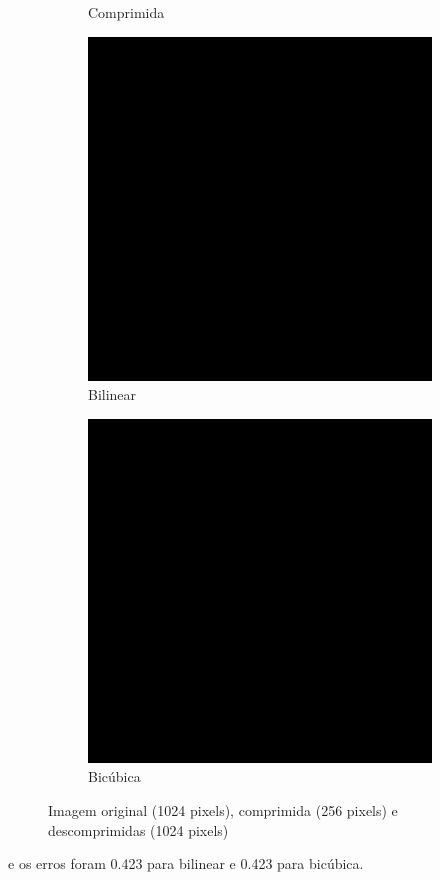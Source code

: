 \documentclass{article}
\begin{document}
\begin{figure}[ht]
\begin{subfigure}{0.23\textwidth}
    \caption{Comprimida}
  \end{subfigure}%
  \hfill
  \begin{subfigure}{0.23\textwidth}
    \centering
    \includegraphics[width=\textwidth]{pb/decompressed-bilinear.png}
    \caption{Bilinear}
  \end{subfigure}%
  \hfill
  \begin{subfigure}{0.23\textwidth}
    \centering
    \includegraphics[width=\textwidth]{pb/decompressed-bicubica.png}
    \caption{Bicúbica}
  \end{subfigure}
  \caption{Imagem original (1024 pixels), comprimida (256 pixels) e descomprimidas (1024 pixels)}
\end{figure}
\newpage
e os erros foram 0.423 para bilinear e 0.423 para bicúbica.
\end{document}
